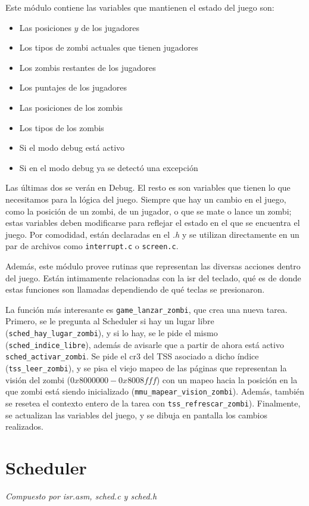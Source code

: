\documentclass{article}
\begin{document}
	Este módulo contiene las variables que mantienen el estado del juego son:
	
	\begin{itemize}[topsep=0pt]
		\item Las posiciones $y$ de los jugadores
		\item Los tipos de zombi actuales que tienen jugadores
		\item Los zombis restantes de los jugadores
		\item Los puntajes de los jugadores
		\item Las posiciones de los zombis
		\item Los tipos de los zombis
		\item Si el modo debug está activo
		\item Si en el modo debug ya se detectó una excepción
	\end{itemize}
	
	Las últimas dos se verán en Debug. El resto es son variables que tienen lo que necesitamos para la lógica del juego. Siempre que hay un cambio en el juego, como la posición de un zombi, de un jugador, o que se mate o lance un zombi; estas variables deben modificarse para reflejar el estado en el que se encuentra el juego. Por comodidad, están declaradas en el \textit{.h} y se utilizan directamente en un par de archivos como \texttt{interrupt.c} o \texttt{screen.c}.
	
	Además, este módulo provee rutinas que representan las diversas acciones dentro del juego. Están intimamente relacionadas con la isr del teclado, qué es de donde estas funciones son llamadas dependiendo de qué teclas se presionaron.
	
	La función más interesante es \texttt{game\_lanzar\_zombi}, que crea una nueva tarea. Primero, se le pregunta al Scheduler si hay un lugar libre (\texttt{sched\_hay\_lugar\_zombi}), y si lo hay, se le pide el mismo (\texttt{sched\_indice\_libre}), además de avisarle que a partir de ahora está activo \texttt{sched\_activar\_zombi}. Se pide el cr3 del TSS asociado a dicho índice (\texttt{tss\_leer\_zombi}), y se pisa el viejo mapeo de las páginas que representan la visión del zombi ($0x8000000 - 0x8008fff$) con un mapeo hacia la posición en la que zombi está siendo inicializado (\texttt{mmu\_mapear\_vision\_zombi}). Además, también se resetea el contexto entero de la tarea con \texttt{tss\_refrescar\_zombi}). Finalmente, se actualizan las variables del juego, y se dibuja en pantalla los cambios realizados.
	
	\section{Scheduler}
	\vspace{-1cm}	
	\begin{flushright}
	\textit{Compuesto por isr.asm, sched.c y sched.h}
	\end{flushright}
	
\end{document}

